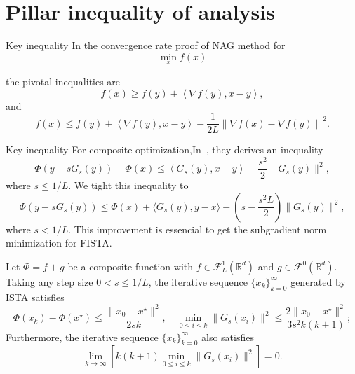 \documentclass[10pt]{beamer}
\begin{document}
\section{Pillar inequality of analysis}
\begin{frame}{Key inequality}
	 In the convergence rate proof of NAG method for
   \begin{equation*}
    \min_x f(x)
   \end{equation*}
  
   the pivotal inequalities are 
   \begin{equation*}
    f(x) \ge f(y) + \left\langle \nabla f(y), x - y\right\rangle,
   \end{equation*}
   and 
   \begin{equation*}
    f(x) \le f(y) + \left\langle \nabla f(y), x - y\right\rangle - \frac{1}{2L}\left\| \nabla f(x) - \nabla f(y) \right\|^2.
   \end{equation*}
\end{frame}

\begin{frame}{Key inequality}
  For composite optimization,In~\citep[Lemma 2.3]{beck2009fast}, they derives an inequality 
  \begin{equation*}
    \Phi(y - sG_s(y)) - \Phi(x) \le \left\langle G_s(y), x - y\right\rangle - \frac{s^2}{2}\|G_s(y)\|^2,
  \end{equation*}
  where $s \le 1/L$. We tight this inequality to 
  \begin{equation}\label{ine}
    \Phi(y - sG_s(y)) \le \Phi(x) + \langle G_s(y), y - x\rangle - \left(s - \frac{s^2 L}{2}\right)\|G_s(y)\|^2,
  \end{equation}
  where $s < 1/L$. This improvement is essencial to get the subgradient norm minimization for FISTA.
\end{frame}

\begin{frame}
  \begin{theorem}
    \label{thm: ista}
    Let $\Phi = f + g$ be a composite function with $f \in \mathcal{F}_{L}^1(\mathbb{R}^d)$ and $g \in \mathcal{F}^0(\mathbb{R}^d)$. Taking any step size $0 < s \leq 1/L$, the iterative sequence $\{x_k\}_{k=0}^{\infty}$ generated by ISTA satisfies
    \begin{equation}
      \label{eqn: ista-s}
      \Phi(x_k) - \Phi(x^\star) \leq \frac{\|x_0 - x^\star\|^2}{2sk}, \quad \min_{0\leq i \leq k} \| G_s(x_i) \|^2 \leq \frac{2\|x_0 - x^\star\|^2}{3s^2 k(k+1)};   
    \end{equation}
    Furthermore, the iterative sequence $\{x_k\}_{k=0}^{\infty}$ also satisfies
    \begin{equation}
      \label{eqn: ista-s1}
      \lim_{k\rightarrow \infty} \left[k(k+1)\min_{0\leq i \leq k} \| G_s(x_i) \|^2\right] = 0.
    \end{equation}
  \end{theorem}
\end{frame}
\end{document}
